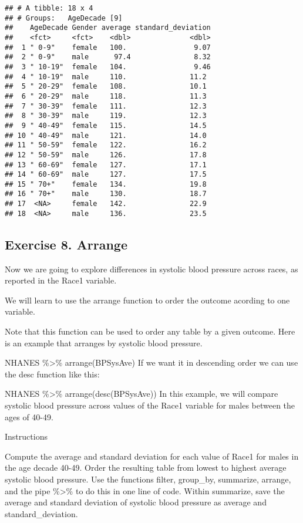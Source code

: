 \documentclass[
]{article}
\begin{document}
\begin{verbatim}
## # A tibble: 18 x 4
## # Groups:   AgeDecade [9]
##    AgeDecade Gender average standard_deviation
##    <fct>     <fct>    <dbl>              <dbl>
##  1 " 0-9"    female   100.                9.07
##  2 " 0-9"    male      97.4               8.32
##  3 " 10-19"  female   104.                9.46
##  4 " 10-19"  male     110.               11.2 
##  5 " 20-29"  female   108.               10.1 
##  6 " 20-29"  male     118.               11.3 
##  7 " 30-39"  female   111.               12.3 
##  8 " 30-39"  male     119.               12.3 
##  9 " 40-49"  female   115.               14.5 
## 10 " 40-49"  male     121.               14.0 
## 11 " 50-59"  female   122.               16.2 
## 12 " 50-59"  male     126.               17.8 
## 13 " 60-69"  female   127.               17.1 
## 14 " 60-69"  male     127.               17.5 
## 15 " 70+"    female   134.               19.8 
## 16 " 70+"    male     130.               18.7 
## 17  <NA>     female   142.               22.9 
## 18  <NA>     male     136.               23.5
\end{verbatim}

\hypertarget{exercise-8.-arrange}{%
\subsection{Exercise 8. Arrange}\label{exercise-8.-arrange}}

Now we are going to explore differences in systolic blood pressure
across races, as reported in the Race1 variable.

We will learn to use the arrange function to order the outcome acording
to one variable.

Note that this function can be used to order any table by a given
outcome. Here is an example that arranges by systolic blood pressure.

NHANES \%\textgreater\% arrange(BPSysAve) If we want it in descending
order we can use the desc function like this:

NHANES \%\textgreater\% arrange(desc(BPSysAve)) In this example, we will
compare systolic blood pressure across values of the Race1 variable for
males between the ages of 40-49.

Instructions

Compute the average and standard deviation for each value of Race1 for
males in the age decade 40-49. Order the resulting table from lowest to
highest average systolic blood pressure. Use the functions filter,
group\_by, summarize, arrange, and the pipe \%\textgreater\% to do this
in one line of code. Within summarize, save the average and standard
deviation of systolic blood pressure as average and standard\_deviation.
\end{document}
